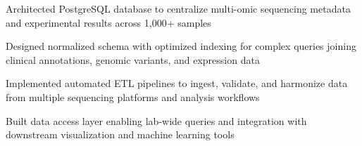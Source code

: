 \item Architected PostgreSQL database to centralize multi-omic sequencing metadata and experimental results across 1,000+ samples
\item Designed normalized schema with optimized indexing for complex queries joining clinical annotations, genomic variants, and expression data
\item Implemented automated ETL pipelines to ingest, validate, and harmonize data from multiple sequencing platforms and analysis workflows
\item Built data access layer enabling lab-wide queries and integration with downstream visualization and machine learning tools
